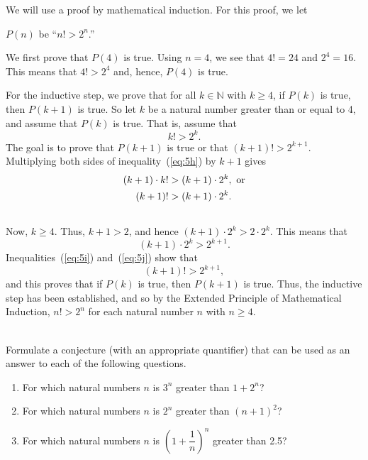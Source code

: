\begin{myproof}
We will use a proof by mathematical induction.  For this proof, we let
\begin{center}
  $P( n )$ be ``$n! > 2^n$.''
\end{center}
%
We first prove that $P( 4 )$ is true.  Using  $n = 4$, we see that  $4! = 24$ and 
$2^4  = 16$.  This means that  $4! > 2^4 $ and, hence,  $P\left( 4 \right)$  is true.

For the inductive step, we prove that for all $k \in \mathbb{N}$ with $k \geq 4$, if 
$P( k )$ is true, then $P( k + 1 )$ is true.  So let  $k$  be a natural number greater than or equal to 4, and assume that  $P( k )$  is true.  That is, assume that
\begin{equation} \label{eq:5h}
k! > 2^k. 
\end{equation}
The goal is to prove that  $P( {k + 1} )$ is true or that  $\left( {k + 1} \right)! > 2^{k + 1}$.  Multiplying both sides of inequality~(\ref{eq:5h}) by $k + 1$ gives
\begin{align} \notag
  \left( k + 1 \right) \cdot k! &> \left( k + 1 \right) \cdot 2^k ,\text{  or} \\ \label{eq:5i}
  \left( k + 1 \right)! &> \left( k + 1 \right) \cdot 2^k .  \\ \notag
\end{align}
Now, $k \geq 4$.  Thus, $k + 1 > 2$, and hence $\left( k + 1 \right) \cdot 2^k > 2 \cdot 2^k$.  This means that
\begin{equation} \label{eq:5j}
\left( k + 1 \right) \cdot 2^k > 2^{k + 1}.
\end{equation}
Inequalities~(\ref{eq:5i}) and~(\ref{eq:5j}) show that
\[
(k + 1)! > 2^{k + 1}, 
\]
and this proves that if $P(k)$ is true, then  $P( {k + 1} )$ is true.  Thus, the inductive step has been established, and so by the Extended Principle of Mathematical Induction, $n! > 2^n $ for each natural number  
$n$   with  $n \geq 4$.
\end{myproof}
\hbreak
%

\begin{prog} \label{prog:extendedind} \hfill \\
Formulate a conjecture (with an appropriate quantifier) that can be used as an answer to each of the following questions.
\begin{enumerate}
\item For which natural numbers $n$ is $3^n$ greater than $1 + 2^n$?
\item For which natural numbers $n$ is $2^n$ greater than $\left(n + 1 \right)^2$?
\item For which natural numbers $n$ is $\left( 1 + \dfrac{1}{n} \right)^n$ greater than 2.5?
\end{enumerate}
\end{prog}
\hbreak


